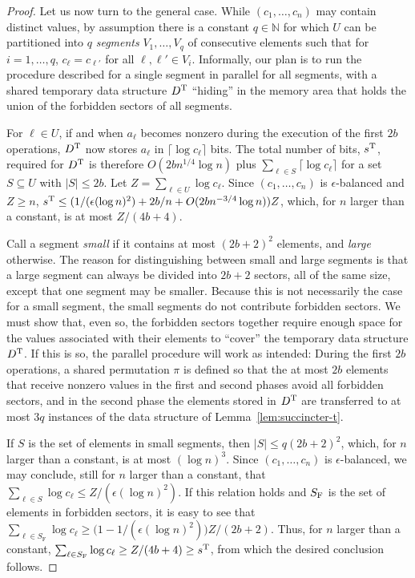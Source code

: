 \documentclass[envcountsame,envcountsect,undated,nolinenumbers]{lnthi}
\def\Tceil#1{\lceil #1\rceil}
\def\TbbbN{\mathbb{N}}
\begin{document}
\begin{proof}
Let us now turn to the general case.
While $(c_1,\ldots,c_n)$ may contain 
distinct values, by assumption there is a constant
$q\in\TbbbN$ for which $U$ can be partitioned
into $q$ \emph{segments} $V_1,\ldots,V_q$
of consecutive elements such that for
$i=1,\ldots,q$, $c_{\ell}=c_{\ell'}$
for all $\ell,\ell'\in V_i$.
Informally, our plan is to run the procedure described for
a single segment in parallel for all segments,
with a shared temporary data structure $D^{\mbox{\scriptsize T}}$
``hiding'' in the memory area that holds
the union of the forbidden sectors of all segments.

For $\ell\in U$,
if and when $a_\ell$ becomes nonzero
during the execution of the first $2 b$ operations,
$D^{\mbox{\scriptsize T}}$ now stores $a_\ell$
in $\Tceil{\log c_\ell}$ bits.
The total number of bits, $s^{\mbox{\scriptsize T}}$, required for $D^{\mbox{\scriptsize T}}$
is therefore $O(2 b n^{1/4}\log n)$ plus
$\sum_{\ell\in S}\Tceil{\log c_\ell}$ for a
set $S\subseteq U$ with $|S|\le 2 b$.
Let $Z=\sum_{\ell\in U}\log c_\ell$.
Since $(c_1,\ldots,c_n)$ is $\epsilon$-balanced
and $Z\ge n$,
$s^{\mbox{\scriptsize T}}\le({1/{(\epsilon (\log n)^2)}}+2 {b/n}
 +O(2 b n^{{-3}/4}\log n))Z$,
which, for $n$ larger than a constant, is at most
${Z/{(4 b+4)}}$.

Call a segment \emph{small} if it contains at
most $(2 b+2)^2$ elements, and
\emph{large} otherwise.
The reason for distinguishing between small and
large segments is that a
large segment can always be divided into $2 b+2$
sectors, all of the same size, except that
one segment may be smaller.
Because this is
not necessarily the case for a small segment,
the small segments do not contribute
forbidden sectors.
We must show that, even so, the forbidden sectors
together require enough space for the values
associated with their elements to ``cover''
the temporary data structure $D^{\mbox{\scriptsize T}}$.
If this is so, the parallel procedure will
work as intended:
During the first $2 b$ operations, a shared
permutation $\pi$ is defined so that the at
most $2 b$ elements that receive nonzero values
in the first and second phases avoid all
forbidden sectors, and in the second phase
the elements stored in $D^{\mbox{\scriptsize T}}$ are
transferred to at most $3 q$ instances
of the data structure of Lemma~\ref{lem:succincter-t}.

If $S$ is the set of elements in small segments,
then $|S|\le q (2 b+2)^2$, which, for $n$ larger
than a constant, is at most $(\log n)^3$.
Since $(c_1,\ldots,c_n)$ is $\epsilon$-balanced,
we may conclude, still for $n$ larger than a
constant, that
$\sum_{\ell\in S}\log c_\ell
\le{Z/{(\epsilon (\log n)^2)}}$.
If this relation holds and $S_{\mbox{\scriptsize F}}$ is the set of
elements in forbidden sectors, it is easy to see that
$\sum_{\ell\in S_{\mathrm{F}}}\log c_\ell
\ge({{{1-1/{(\epsilon (\log n)^2)}})Z}/{(2 b+2)}}.$
Thus, for $n$ larger than a constant,
$\sum_{\ell\in S_{\mathrm{F}}}\log c_\ell
\ge{Z/{(4 b+4)}}\ge s^{\mbox{\scriptsize T}}$,
from which the desired conclusion follows.
\end{proof}
\end{document}
